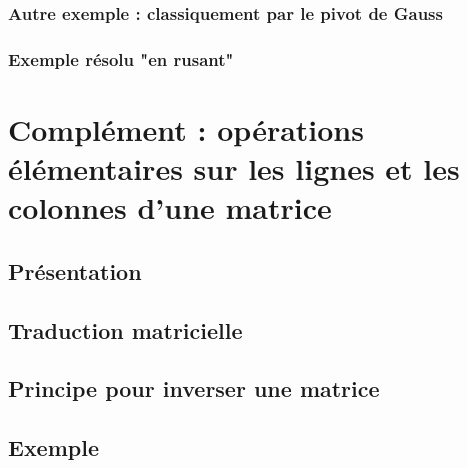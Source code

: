 \documentclass[12pt,a4paper,french]{book}
\begin{document}
		\subsection{Autre exemple : classiquement par le pivot de Gauss}
		\subsection{Exemple résolu "en rusant"}
		
\chapter{Complément : opérations élémentaires sur les lignes et les colonnes d'une matrice}
	\section{Présentation}
	\section{Traduction matricielle}
	\section{Principe pour inverser une matrice}
	\section{Exemple}

	
	
\end{document}
